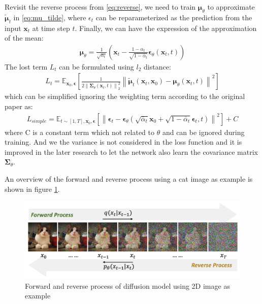 \documentclass[12pt,DIV14,BCOR12mm,a4paper,footinclude=false,headinclude,parskip=half-,twoside,openright,cleardoublepage=empty,toc=index,bibliography=totoc,listof=totoc]{scrreprt}
\numberwithin{equation}{chapter}
\begin{document}
Revisit the reverse process from \ref{eq:reverse}, we need to train $\boldsymbol{\mu}_{\theta}$ to approximate $\boldsymbol{\tilde{\mu}}_{t}$ in \ref{eq:mu_tilde}, where $\epsilon_{t}$ can be reparameterized as the prediction from the input $\mathbf{x}_{t}$ at time step $t$. Finally, we can have the expression of the approximation of the mean:
\begin{align}
  \boldsymbol{\mu}_{\theta} = \frac{1}{\sqrt{\alpha_{t}}}\left(\mathbf{x}_{t} - \frac{1-\alpha_{t}}{\sqrt{1-\bar{\alpha}_{t}}}\boldsymbol{\epsilon}_{\theta}(\mathbf{x}_{t}, t)\right)
\end{align}
The lost term $L_{t}$ can be formulated using $l_{2}$ distance:
\begin{align}
  L_{t} = \mathbb{E}_{\mathbf{x}_{0},\boldsymbol{\epsilon}}\left[\frac{1}{2 \left\lVert \mathbf{\Sigma}_{\theta}(\mathbf{x}_{t},t)\right\rVert_{2}^{2}}\left\lVert\boldsymbol{\tilde{\mu}}_{t}(\mathbf{x}_{t},\mathbf{x}_{0}) - \boldsymbol{\mu}_{\theta}(\mathbf{x}_{t},t) \right\rVert ^{2}\right]
\end{align}
which can be simplified ignoring the weighting term according to the original paper\cite{ho2020denoising} as:
\begin{align}
  L_{simple} = \mathbb{E}_{t\sim[1,T],\mathbf{x}_{0},\boldsymbol{\epsilon}}\left[\left\lVert\boldsymbol{\epsilon}_{t} - \boldsymbol{\epsilon}_{\theta}(\sqrt{\bar{\alpha}_{t}}\mathbf{x}_{0} + \sqrt{1 - \bar{\alpha}_{t}}\boldsymbol{\epsilon}_{t}, t)\right\rVert ^{2}\right] + C
\end{align}
where C is a constant term which not related to $\theta$ and can be ignored during training.  And we the variance is not considered in the loss function and it is improved in the later research\cite{nichol2021improved} to let the network also learn the covariance matrix $\mathbf{\Sigma}_{\theta}$.

An overview of the forward and reverse process using a cat image as example is shown in figure \ref{img:diff_process}.
\begin{figure}[h]
	\centering
	\includegraphics[scale=.2]{img/diff_process.png}
	\caption{Forward and reverse process of diffusion model using 2D image as example}
	\label{img:diff_process}
\end{figure}
\end{document}
